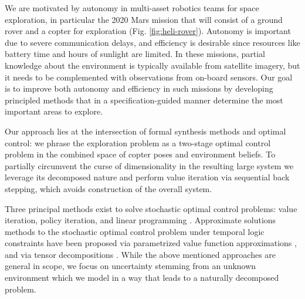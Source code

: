 \documentclass[conference]{IEEEtran}
\begin{document}
We are motivated by autonomy  in multi-asset robotics teams for space exploration, in particular the 2020 Mars mission that will consist of a ground rover and a copter for exploration (Fig. \ref{fig:heli-rover}). Autonomy is important due to severe communication delays, and efficiency is desirable since resources like battery time and hours of sunlight are limited. In these missions, partial knowledge about the environment is typically available from satellite imagery, but it needs to be complemented with observations from on-board sensors. Our goal is to improve both autonomy and efficiency in such missions by developing principled methods that in a specification-guided manner determine the most important areas to explore. 

Our approach lies at the intersection of formal synthesis methods and optimal control: we phrase the exploration problem as a two-stage optimal control problem in the combined space of copter poses and environment beliefs.
To partially circumvent the curse of dimensionality in the resulting large system we leverage its decomposed nature and perform value iteration via sequential back stepping, which avoids construction of the overall system.


Three principal methods exist to solve stochastic optimal control problems: value iteration, policy iteration, and linear programming \cite{Bertsekas1978}. Approximate solutions methods to the stochastic optimal control problem under temporal logic constraints have been proposed via parametrized value function approximations \cite{Papusha2016,Leong2016}, and via tensor decompositions \cite{Alora2016}. While the above mentioned approaches are general in scope, we focus on uncertainty stemming from an unknown environment which we model in a way that leads to a naturally decomposed problem. 

\end{document}
